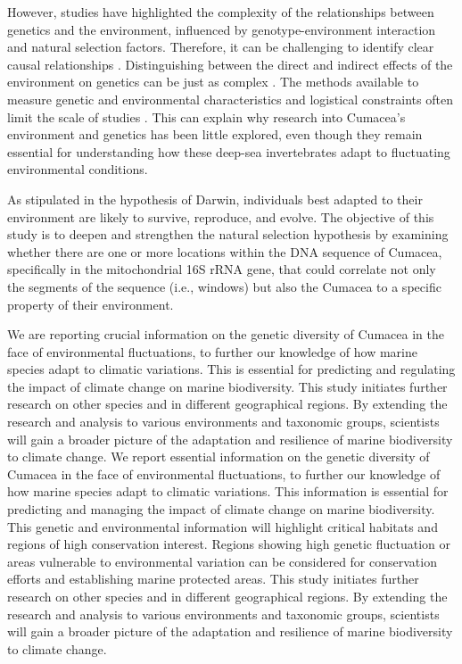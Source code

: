 However, studies have highlighted the complexity of the relationships between genetics and the environment, influenced by genotype-environment interaction and natural selection factors. Therefore, it can be challenging to identify clear causal relationships \citep{balkenhol_identifying_2009}. Distinguishing between the direct and indirect effects of the environment on genetics can be just as complex  \citep{manel_perspectives_2010, balkenhol_landscape_2019}. The methods available to measure genetic and environmental characteristics and logistical constraints often limit the scale of studies \citep{manel_perspectives_2010, shafer_widespread_2013}. This can explain why research into Cumacea’s environment and genetics has been little explored, even though they remain essential for understanding how these deep-sea invertebrates adapt to fluctuating environmental conditions.

As stipulated in the hypothesis of Darwin, individuals best adapted to their environment are likely to survive, reproduce, and evolve. The objective of this study is to deepen and strengthen the natural selection hypothesis by examining whether there are one or more locations within the DNA sequence of Cumacea, specifically in the mitochondrial 16S rRNA gene, that could correlate not only the segments of the sequence (i.e., windows) but also the Cumacea to a specific property of their environment. 

We are reporting crucial information on the genetic diversity of Cumacea in the face of environmental fluctuations, to further our knowledge of how marine species adapt to climatic variations. This is essential for predicting and regulating the impact of climate change on marine biodiversity. This study initiates further research on other species and in different geographical regions. By extending the research and analysis to various environments and taxonomic groups, scientists will gain a broader picture of the adaptation and resilience of marine biodiversity to climate change. We report essential information on the genetic diversity of Cumacea in the face of environmental fluctuations, to further our knowledge of how marine species adapt to climatic variations. This information is essential for predicting and managing the impact of climate change on marine biodiversity. This genetic and environmental information will highlight critical habitats and regions of high conservation interest. Regions showing high genetic fluctuation or areas vulnerable to environmental variation can be considered for conservation efforts and establishing marine protected areas. This study initiates further research on other species and in different geographical regions. By extending the research and analysis to various environments and taxonomic groups, scientists will gain a broader picture of the adaptation and resilience of marine biodiversity to climate change.


